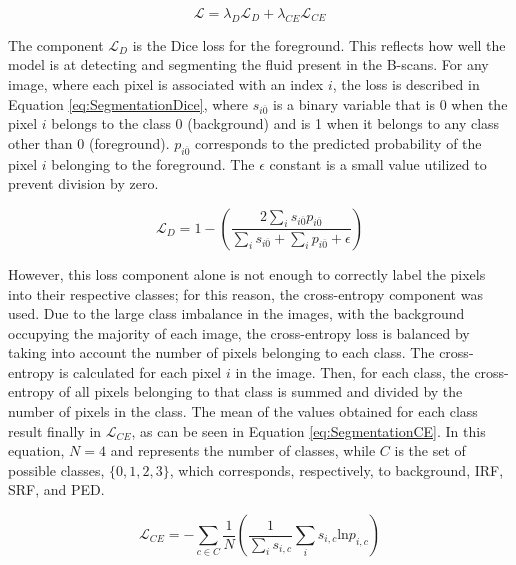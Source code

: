 \begin{equation}
	\mathcal{L} = \lambda_{D} \mathcal{L}_{D} + \lambda_{CE} \mathcal{L}_{CE}
	\label{eq:SegmentationLoss}
\end{equation}

The component $\mathcal{L}_{D}$ is the Dice loss for the foreground. This reflects how well the model is at detecting and segmenting the fluid present in the B-scans. For any image, where each pixel is associated with an index $i$, the loss is described in Equation \ref{eq:SegmentationDice}, where $s_{i\overline{0}}$ is a binary variable that is 0 when the pixel $i$ belongs to the class 0 (background) and is 1 when it belongs to any class other than 0 (foreground). $p_{i\overline{0}}$ corresponds to the predicted probability of the pixel $i$ belonging to the foreground. The $\epsilon$ constant is a small value utilized to prevent division by zero.

\begin{equation}
	\mathcal{L}_{D} = 1 - \left( \frac{2 \sum_{i} s_{i\overline{0}} p_{i\overline{0}}}{\sum_{i} s_{i\overline{0}} + \sum_{i} p_{i\overline{0}} + \epsilon} \right)
	\label{eq:SegmentationDice}
\end{equation}

However, this loss component alone is not enough to correctly label the pixels into their respective classes; for this reason, the cross-entropy component was used. Due to the large class imbalance in the images, with the background occupying the majority of each image, the cross-entropy loss is balanced by taking into account the number of pixels belonging to each class. The cross-entropy is calculated for each pixel $i$ in the image. Then, for each class, the cross-entropy of all pixels belonging to that class is summed and divided by the number of pixels in the class. The mean of the values obtained for each class result finally in $\mathcal{L}_{CE}$, as can be seen in Equation \ref{eq:SegmentationCE}. In this equation, $N=4$ and represents the number of classes, while $C$ is the set of possible classes, $\{0,1,2,3\}$, which corresponds, respectively, to background, IRF, SRF, and PED.

\begin{equation}
	\mathcal{L}_{CE} = - \sum_{c \in C} \frac{1}{N}\left( \frac{1}{\sum_{i} s_{i,c}} \sum_{i} s_{i,c} \text{ln} p_{i,c} \right)
	\label{eq:SegmentationCE}
\end{equation}

